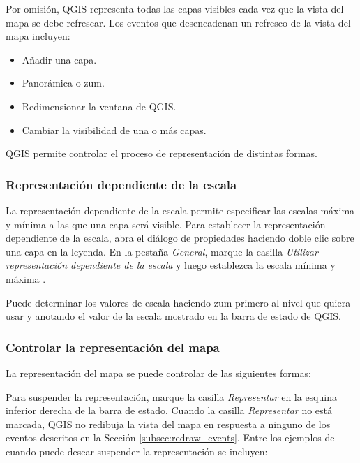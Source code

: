 Por omisión, QGIS representa todas las capas visibles cada vez que la vista del mapa se debe refrescar. Los eventos 
que desencadenan un refresco de la vista del mapa incluyen:

\begin{itemize}
\item Añadir una capa.
\item Panorámica o zum.
\item Redimensionar la ventana de QGIS.
\item Cambiar la visibilidad de una o más capas.
\end{itemize}

QGIS permite controlar el proceso de representación de distintas formas.

\subsubsection{Representación dependiente de la escala}
\label{label_scaledepend}

La representación dependiente de la escala permite especificar las escalas máxima y mínima a las que una capa será 
visible. Para establecer la representación dependiente de la escala, abra el diálogo de propiedades haciendo 
doble clic sobre una capa en la leyenda. En la pestaña \textit{General}, marque la casilla  \textit{Utilizar 
representación dependiente de la escala} y luego establezca la escala mínima y máxima .

Puede determinar los valores de escala haciendo zum primero al nivel que quiera usar y anotando el valor de la 
escala mostrado en la barra de estado de QGIS.

\subsubsection{Controlar la representación del mapa}\label{label_controlmap}

La representación del mapa se puede controlar de las siguientes formas:

\label{label_suspendrender}

Para suspender la representación, marque la casilla \textit{Representar} en la esquina inferior derecha de la 
barra de estado. Cuando la casilla \textit{Representar} no está marcada, QGIS no redibuja la vista del mapa en 
respuesta a ninguno de los eventos descritos en la Sección
\ref{subsec:redraw_events}. Entre los ejemplos de cuando puede desear suspender la representación se incluyen:

